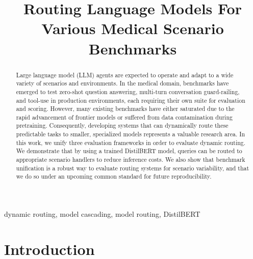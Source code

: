\documentclass[conference]{IEEEtran}
\begin{document}
\lstset{style=promptstyle}

\title{Routing Language Models For Various Medical Scenario Benchmarks\\}

\author{
}

\maketitle

\begin{abstract}
Large language model (LLM) agents are expected to operate and adapt to a wide variety of scenarios and environments. In the medical domain, benchmarks have emerged to test zero-shot question answering, multi-turn conversation guard-railing, and tool-use in production environments, each requiring their own suite for evaluation and scoring. However, many existing benchmarks have either saturated due to the rapid advancement of frontier models or suffered from data contamination during pretraining. Consequently, developing systems that can dynamically route these predictable tasks to smaller, specialized models represents a valuable research area. In this work, we unify three evaluation frameworks in order to evaluate dynamic routing. We demonstrate that by using a trained DistilBERT model, queries can be routed to appropriate scenario handlers to reduce inference costs. We also show that benchmark unification is a robust way to evaluate routing systems for scenario variability, and that we do so under an upcoming common standard for future reproducibility.
\end{abstract}

\begin{IEEEkeywords}
dynamic routing, model cascading, model routing, DistilBERT
\end{IEEEkeywords}

\section{Introduction}
\end{document}
